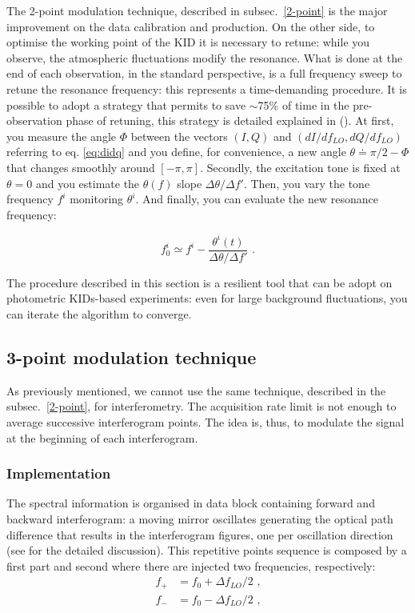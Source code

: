 \documentclass[twocolumn,traditabstract]{aa}\\
\begin{document}
The 2-point modulation technique, described in subsec.~\ref{2-point} is the major improvement on the data calibration and production. On the other side, to optimise the working point of the KID it is necessary to retune: while you observe, the atmospheric fluctuations modify the resonance. What is done at the end of each observation, in the standard perspective, is a full frequency sweep to retune the resonance frequency: this represents a time-demanding procedure. It is possible to adopt a strategy that permits to save $\sim$75\% of time in the pre-observation phase of retuning, this strategy is detailed explained in (\cite{2014SPIE.9153E..02C}). At first, you measure the angle $\Phi$ between the vectors $(I,Q)$ and $(dI/df_{LO},dQ/df_{LO})$ referring to eq. \ref{eq:didq} and you define, for convenience, a new angle $\theta\doteq \pi/2-\Phi$ that changes smoothly around $[-\pi,\pi]$. Secondly, the excitation tone is fixed at $\theta=0$ and you estimate the $\theta(f)$ slope $\Delta\theta/\Delta f'$. Then, you vary the tone frequency $f^i$ monitoring $\theta^i$. And finally, you can evaluate the new resonance frequency:

\begin{equation}
f^i_0 \simeq f^i - \frac{\theta^i(t)}{\Delta\theta/\Delta f'} \text{ .}
\end{equation}

The procedure described in this section is a resilient tool that can be adopt on photometric KIDs-based experiments: even for large background fluctuations, you can iterate the algorithm to converge.
\color{black}

\subsection{3-point modulation technique}

As previously mentioned, we cannot use the same technique, described in the subsec.~\ref{2-point}, for interferometry. The acquisition rate limit is not enough to average successive interferogram points. The idea is, thus, to modulate the signal at the beginning of each interferogram.

\subsubsection{Implementation}
The spectral information is organised in data block containing forward and backward interferogram: a moving mirror oscillates generating the optical path difference that results in the interferogram figures, one per oscillation direction (see \cite{fasano-ltd} for the detailed discussion). This repetitive points sequence is composed by a first part and second where there are injected two frequencies, respectively:
\begin{equation}
\begin{align}
f_+ &= f_0 + \Delta f_{LO}/2 	\text{ ,}
\\
f_- &= f_0 - \Delta f_{LO}/2	\text{ ,}
\end{align}
\label{eq:fmod}
\end{equation}
\end{document}

